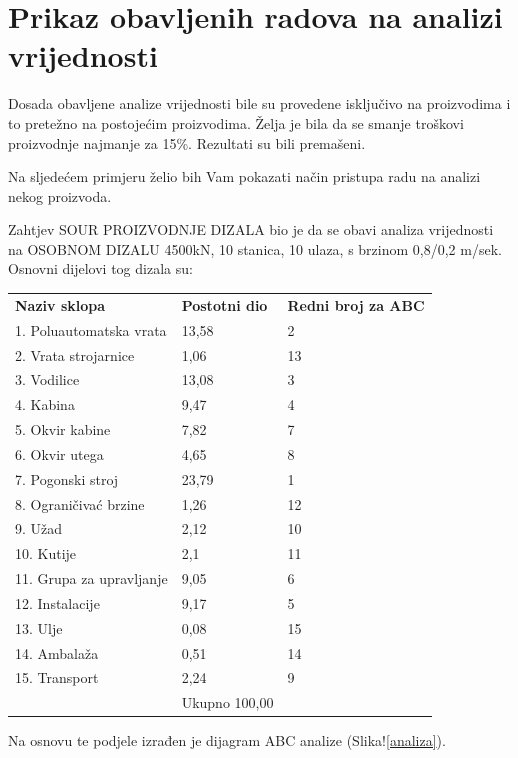 \documentclass[a4paper,12pt]{article}
\numberwithin{figure}{section}
\begin{document}
\section*{Prikaz obavljenih radova na analizi vrijednosti}
Dosada obavljene analize vrijednosti bile su provedene isključivo na proizvodima i to pretežno na postojećim proizvodima. Želja je bila da se smanje troškovi proizvodnje najmanje za 15\%. Rezultati su bili premašeni.\par
Na sljedećem primjeru želio bih Vam pokazati način pristupa radu na analizi nekog proizvoda.\par
Zahtjev SOUR PROIZVODNJE DIZALA bio je da se obavi analiza vrijednosti na OSOBNOM DIZALU 4500kN, 10 stanica, 10 ulaza, s brzinom 0,8/0,2 m/sek. Osnovni dijelovi tog dizala su:
\FloatBarrier
\begin{table}[h!]
\centering
\begin{tabular}{lll}
\textbf{Naziv sklopa}             & \textbf{Postotni dio}  & \textbf{Redni broj za ABC} \\
1. Poluautomatska vrata  & 13,58         & 2                 \\
2. Vrata strojarnice     & 1,06          & 13                \\
3. Vodilice              & 13,08         & 3                 \\
4. Kabina                & 9,47          & 4                 \\
5. Okvir kabine          & 7,82          & 7                 \\
6. Okvir utega           & 4,65          & 8                 \\
7. Pogonski stroj        & 23,79         & 1                 \\
8. Ograničivać brzine    & 1,26          & 12                \\
9. Užad                  & 2,12          & 10                \\
10. Kutije               & 2,1           & 11                \\
11. Grupa za upravljanje & 9,05          & 6                 \\
12. Instalacije          & 9,17          & 5                 \\
13. Ulje                 & 0,08          & 15                \\
14. Ambalaža             & 0,51          & 14                \\
15. Transport            & 2,24          & 9                 \\ \hline
                         & Ukupno 100,00 &                  
\end{tabular}
\end{table}
Na osnovu te podjele izrađen je dijagram ABC analize (Slika!\ref{analiza}).
\end{document}
